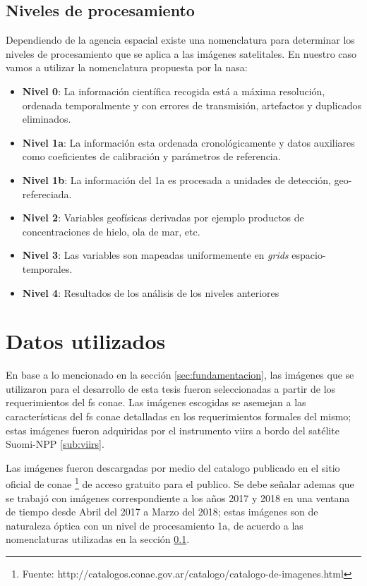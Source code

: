 \subsection{Niveles de procesamiento}\label{sub:nivelesdeprocesamiento}
Dependiendo de la agencia espacial existe una nomenclatura para determinar los niveles de procesamiento que se aplica a las imágenes satelitales. En nuestro caso vamos a utilizar la nomenclatura propuesta por la \ac{nasa}:
\begin{itemize}
	\item \textbf{Nivel 0}: La información científica recogida está a máxima resolución, ordenada temporalmente y con errores de transmisión, artefactos y duplicados eliminados.
 	\item \textbf{Nivel 1a}: La información esta ordenada cronológicamente y datos auxiliares como coeficientes de calibración y parámetros de referencia.
 	\item \textbf{Nivel 1b}: La información del 1a es procesada a unidades de detección, geo-refereciada.
 	\item \textbf{Nivel 2}: Variables geofísicas derivadas por ejemplo productos de concentraciones de hielo, ola de mar, etc.
 	\item \textbf{Nivel 3}: Las variables son mapeadas uniformemente en \textit{grids} espacio-temporales.
 	\item \textbf{Nivel 4}: Resultados de los análisis de los niveles anteriores
\end{itemize}


\section{Datos utilizados}\label{sec:datosutilizados}

En base a lo mencionado en la sección \ref{sec:fundamentacion}, las imágenes que se utilizaron para el desarrollo de esta tesis fueron seleccionadas a partir de los requerimientos del \ac{fs} \ac{conae}. Las imágenes escogidas se asemejan a las características del \ac{fs} \ac{conae} detalladas en los requerimientos formales del mismo; estas imágenes fueron adquiridas por el instrumento \ac{viirs} a bordo del satélite Suomi-NPP \ref{sub:viirs}.

Las imágenes fueron descargadas por medio del catalogo  publicado en el sitio oficial de \ac{conae} \footnote{Fuente: http://catalogos.conae.gov.ar/catalogo/catalogo-de-imagenes.html} de acceso gratuito para el publico. Se debe señalar ademas que se trabajó con imágenes correspondiente a los años 2017 y 2018 en una ventana de tiempo desde Abril del 2017 a Marzo del 2018; estas imágenes son de naturaleza óptica con un nivel de procesamiento 1a, de acuerdo a las nomenclaturas utilizadas en la sección \ref{sub:nivelesdeprocesamiento}.


